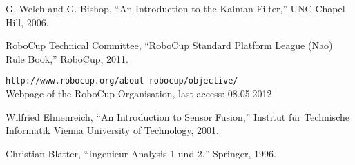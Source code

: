 

\begin{thebibliography}{30}


 G. Welch and G. Bishop, ``An Introduction to the Kalman Filter,'' UNC-Chapel Hill, 2006.

 RoboCup Technical Committee, ``RoboCup Standard Platform League (Nao) Rule Book,'' RoboCup, 2011.

 \texttt{http://www.robocup.org/about-robocup/objective/}\\
Webpage of the RoboCup Organisation, last access:
08.05.2012

 Wilfried Elmenreich, ``An Introduction to Sensor Fusion,'' Institut für Technische Informatik Vienna University of Technology, 2001.

 Christian Blatter, ``Ingenieur Analysis 1 und 2,'' Springer, 1996.


\end{thebibliography}
